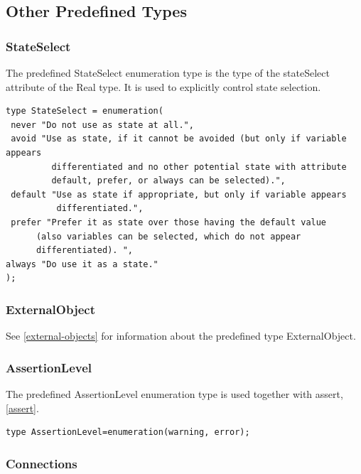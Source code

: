 \documentclass[10pt,a4paper]{report}
\def\doublelabel#1{\label{#1}}
\begin{document}
\subsection{Other Predefined Types}\doublelabel{other-predefined-types}

\subsubsection{StateSelect}\doublelabel{stateselect}

The predefined StateSelect enumeration type is the type of the
stateSelect attribute of the Real type. It is used to explicitly control
state selection.

\begin{lstlisting}[language=Modelica]
type StateSelect = enumeration(
 never "Do not use as state at all.",
 avoid "Use as state, if it cannot be avoided (but only if variable appears
         differentiated and no other potential state with attribute
         default, prefer, or always can be selected).",
 default "Use as state if appropriate, but only if variable appears
          differentiated.",
 prefer "Prefer it as state over those having the default value
      (also variables can be selected, which do not appear
      differentiated). ",
always "Do use it as a state."
);
\end{lstlisting}

\subsubsection{ExternalObject}\doublelabel{externalobject}

See \ref{external-objects} for information about the predefined type
ExternalObject.

\subsubsection{AssertionLevel}\doublelabel{assertionlevel}

The predefined AssertionLevel enumeration type is used together with
assert, \ref{assert}.
\begin{lstlisting}[language=Modelica]
type AssertionLevel=enumeration(warning, error);
\end{lstlisting}

\subsubsection{Connections}\doublelabel{connections}
\end{document}
